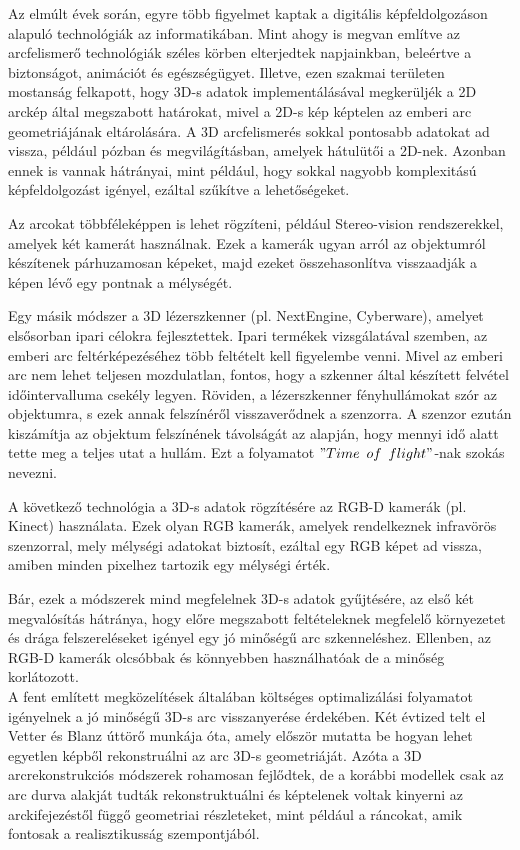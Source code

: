 \documentclass[12pt,a4]{article}
\begin{document}
	 Az elmúlt évek során, egyre több figyelmet kaptak a digitális
	 képfeldolgozáson alapuló technológiák az informatikában. Mint
	 ahogy \cite{survey} is megvan említve az arcfelismerő technológiák széles
	 körben elterjedtek napjainkban, beleértve a biztonságot, animációt
	 és egészségügyet. Illetve, ezen szakmai területen mostanság felkapott,
	 hogy 3D-s adatok implementálásával megkerüljék a 2D arckép által megszabott határokat, mivel a 2D-s kép képtelen az emberi arc geometriájának eltárolására.
	 A 3D arcfelismerés sokkal pontosabb adatokat ad vissza, például pózban
	 és megvilágításban, amelyek hátulütői a 2D-nek. Azonban ennek is vannak
	 hátrányai, mint például, hogy sokkal nagyobb komplexitású képfeldolgozást igényel, ezáltal szűkítve a lehetőségeket.
	 
	 Az arcokat többféleképpen is lehet rögzíteni, például Stereo-vision rendszerekkel, amelyek két kamerát használnak. Ezek a kamerák ugyan arról az objektumról készítenek párhuzamosan képeket, majd ezeket összehasonlítva visszaadják a képen lévő egy pontnak a mélységét.
	  
	 Egy másik módszer a 3D lézerszkenner (pl. NextEngine, Cyberware), amelyet elsősorban ipari célokra fejlesztettek. Ipari termékek vizsgálatával szemben, az emberi arc feltérképezéséhez több feltételt kell figyelembe venni. Mivel az emberi arc nem lehet teljesen mozdulatlan, fontos, hogy a szkenner által készített felvétel időintervalluma csekély legyen.
	 Röviden, a lézerszkenner fényhullámokat szór az objektumra, s ezek annak felszínéről visszaverődnek a szenzorra. A szenzor ezután kiszámítja az objektum felszínének távolságát az alapján, hogy mennyi idő alatt tette meg a teljes utat a hullám. Ezt a folyamatot $"Time\enspace of\enspace flight"$-nak szokás nevezni. 
	 
	 A következő technológia a 3D-s adatok rögzítésére az RGB-D kamerák (pl. Kinect) használata. Ezek olyan RGB kamerák, amelyek rendelkeznek infravörös szenzorral, mely mélységi adatokat biztosít, ezáltal egy RGB képet ad vissza, amiben minden pixelhez tartozik egy mélységi érték.
	 
	 Bár, ezek a módszerek mind megfelelnek 3D-s adatok gyűjtésére, az első két megvalósítás hátránya, hogy előre megszabott feltételeknek megfelelő környezetet és drága felszereléseket igényel egy jó minőségű arc szkenneléshez. Ellenben, az RGB-D kamerák olcsóbbak és könnyebben használhatóak de a minőség korlátozott. \\
	 
	 A fent említett megközelítések általában költséges optimalizálási folyamatot igényelnek a jó minőségű 3D-s arc visszanyerése érdekében. Két évtized telt el \cite{blanzvetter} Vetter és Blanz úttörő munkája óta, amely először mutatta be hogyan lehet egyetlen képből rekonstruálni az arc 3D-s geometriáját. Azóta a 3D arcrekonstrukciós módszerek rohamosan fejlődtek, de a korábbi modellek csak az arc durva alakját tudták rekonstruktuálni és képtelenek voltak kinyerni az arckifejezéstől függő geometriai részleteket, mint például a ráncokat, amik fontosak a realisztikusság szempontjából.
	 
\end{document}
